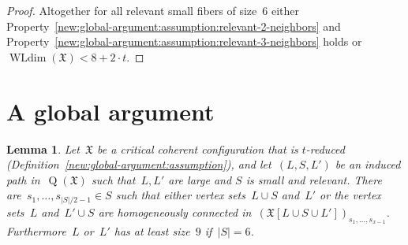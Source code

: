 \documentclass[english,a4paper]{article}
\theoremstyle{plain}
\newtheorem{lemma}      [theorem]{Lemma}
\theoremstyle{definition}
\newcommand{\coherentConfig}{\ensuremath{\mathfrak{X}}}
\DeclareMathOperator*{\WLdim}{WLdim}
\newcommand{\wldim}[1]{\ensuremath{\WLdim\left(#1\right)}}
\DeclareMathOperator*{\Quotient}{Q}
\newcommand{\quotientGraph}[1]{\ensuremath{\Quotient(#1)}}
\begin{document}
\begin{proof}
    Altogether for all relevant small fibers of size~$6$ either Property~\ref{new:global-argument:assumption:relevant-2-neighbors} and Property~\ref{new:global-argument:assumption:relevant-3-neighbors} holds or~$\wldim{\coherentConfig} < 8 + 2\cdot t$.
\end{proof}
     

\section{A global argument}
\label{global-argument/sec}

\begin{lemma}
\label{global-argument:LSL/lem}
    Let~$\coherentConfig$ be a critical coherent configuration that is $t$-reduced (Definition~\ref{new:global-argument:assumption}), and let~$(L,S,L')$ be an induced path in~$\quotientGraph{\coherentConfig}$ such that~$L, L'$ are large and $S$ is small and relevant.
    There are~$s_{1},\dots,s_{|S|/2 -1} \in S$ such that either vertex sets~$L \cup S$ and~$L'$ or the vertex sets~$L$ and~$L' \cup S$ are homogeneously connected in~$(\coherentConfig[L \cup S \cup L'])_{s_1,\dots,s_{x-1}}$.
    Furthermore~$L$ or~$L'$ has at least size~$9$ if~$|S| = 6$.
\end{lemma}
\end{document}

